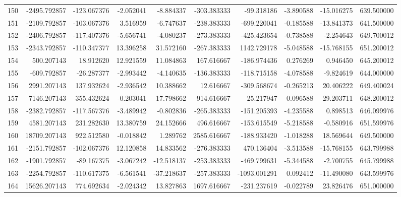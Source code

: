 \begin{tabular}{lrrrrrrrrr}
150 &  -2495.792857 &  -123.067376 &  -2.052041 &  -8.884337 &  -303.383333 &   -99.318186 &  -3.890588 & -15.016275 &  639.500000 \\
151 &  -2109.792857 &  -103.067376 &   3.516959 &  -6.747637 &  -238.383333 &  -699.220041 &  -0.185588 & -13.841373 &  641.500000 \\
152 &  -2406.792857 &  -117.407376 &  -5.656741 &  -4.080237 &  -273.383333 &  -425.423654 &  -0.738588 &  -2.254643 &  649.700012 \\
153 &  -2343.792857 &  -110.347377 &  13.396258 &  31.572160 &  -267.383333 &  1142.729178 &  -5.048588 & -15.768155 &  651.200012 \\
154 &    500.207143 &    18.912620 &  12.921559 &  11.084863 &   167.616667 &  -186.974436 &   0.276269 &   0.946450 &  645.200012 \\
155 &   -609.792857 &   -26.287377 &  -2.993442 &  -4.140635 &  -136.383333 &  -118.715158 &  -4.078588 &  -9.824619 &  644.000000 \\
156 &   2991.207143 &   137.932624 &  -2.936542 &  10.388662 &    12.616667 &  -309.568674 &  -0.265213 &  20.406222 &  649.400024 \\
157 &   7146.207143 &   355.432624 &  -0.203041 &  17.798662 &   914.616667 &    25.217947 &   0.096588 &  29.203711 &  648.200012 \\
158 &  -2382.792857 &  -117.567376 &  -3.489942 &  -0.802836 &  -265.383333 &  -151.205393 &  -4.235588 &   0.898513 &  646.099976 \\
159 &   4581.207143 &   231.282630 &  13.380759 &  24.152666 &   496.616667 &  -153.615549 &  -5.218588 &  -0.580916 &  651.599976 \\
160 &  18709.207143 &   922.512580 &  -0.018842 &   1.289762 &  2585.616667 &  -188.933420 &  -1.018288 &  18.569644 &  649.500000 \\
161 &  -2151.792857 &  -102.067376 &  12.120858 &  14.833562 &  -276.383333 &   470.136404 &  -3.513588 & -15.768155 &  643.799988 \\
162 &  -1901.792857 &   -89.167375 &  -3.067242 & -12.518137 &  -253.383333 &  -469.799631 &  -5.344588 &  -2.700755 &  645.799988 \\
163 &  -2254.792857 &  -110.617375 &  -6.561541 & -37.218637 &  -257.383333 & -1093.001291 &   0.092412 & -11.490080 &  643.599976 \\
164 &  15626.207143 &   774.692634 &  -2.024342 &  13.827863 &  1697.616667 &  -231.237619 &  -0.022789 &  23.826476 &  651.000000 \\

\end{tabular}
